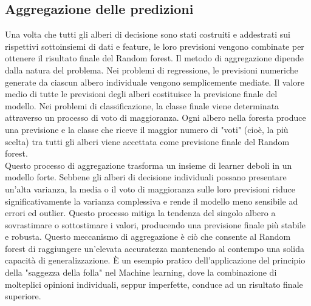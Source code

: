 \documentclass[a4paper,12pt]{report}
\begin{document}
	\subsection{Aggregazione delle predizioni}
	
	Una volta che tutti gli alberi di decisione sono stati costruiti e addestrati sui rispettivi sottoinsiemi di dati e feature, le loro previsioni vengono combinate per ottenere il risultato finale del Random forest. Il metodo di aggregazione dipende dalla natura del problema. Nei problemi di regressione, le previsioni numeriche generate da ciascun albero individuale vengono semplicemente mediate. Il valore medio di tutte le previsioni degli alberi costituisce la previsione finale del modello. Nei problemi di classificazione, la classe finale viene determinata attraverso un processo di voto di maggioranza. Ogni albero nella foresta produce una previsione e la classe che riceve il maggior numero di "voti" (cioè, la più scelta) tra tutti gli alberi viene accettata come previsione finale del Random forest. \\
	Questo processo di aggregazione trasforma un insieme di learner deboli in un modello forte. Sebbene gli alberi di decisione individuali possano presentare un'alta varianza, la media o il voto di maggioranza sulle loro previsioni riduce significativamente la varianza complessiva e rende il modello meno sensibile ad errori ed outlier. Questo processo mitiga la tendenza del singolo albero a sovrastimare o sottostimare i valori, producendo una previsione finale più stabile e robusta. Questo meccanismo di aggregazione è ciò che consente al Random forest di raggiungere un'elevata accuratezza mantenendo al contempo una solida capacità di generalizzazione. È un esempio pratico dell'applicazione del principio della "saggezza della folla" nel Machine learning, dove la combinazione di molteplici opinioni individuali, seppur imperfette, conduce ad un risultato finale superiore.
	
\end{document}
